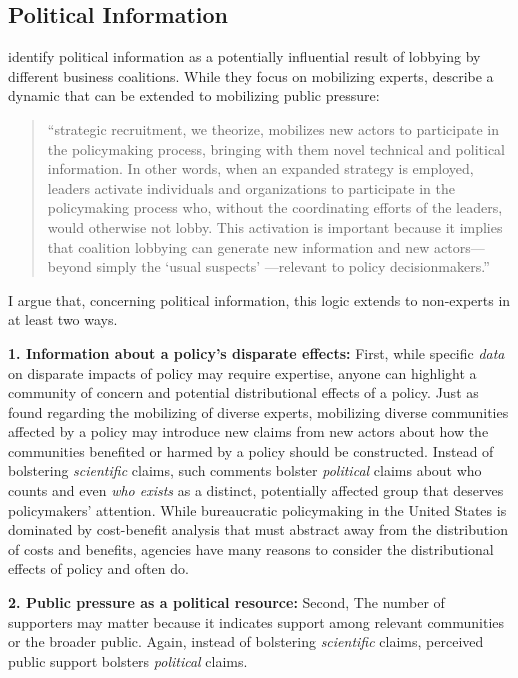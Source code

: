 \documentclass[
      12pt,
        ]{article}
\begin{document}
\hypertarget{political-information}{%
\subsection{Political Information}\label{political-information}}

\citet{Nelson2012}
identify political information as a potentially influential result of
lobbying by different business coalitions. While they focus on
mobilizing experts, \citet{Nelson2012} describe a dynamic that can be extended
to mobilizing public pressure:

\begin{quote}
``strategic recruitment, we theorize, mobilizes new actors to
participate in the policymaking process, bringing with them novel
technical and political information. In other words, when an expanded
strategy is employed, leaders activate individuals and organizations
to participate in the policymaking process who, without the
coordinating efforts of the leaders, would otherwise not lobby. This
activation is important because it implies that coalition lobbying can
generate new information and new actors---beyond simply the `usual
suspects' ---relevant to policy decisionmakers.''
\end{quote}

I argue that, concerning political information, this logic extends to
non-experts in at least two ways.

\textbf{1. Information about a policy's disparate effects:}
First, while specific \emph{data} on disparate impacts of policy may require expertise, anyone can highlight a community of concern and potential distributional effects of a policy. Just as \citet{Nelson2012} found regarding the mobilizing of diverse experts, mobilizing diverse communities affected by a policy may introduce new claims from new actors about how the communities benefited or harmed by a policy should be constructed. Instead of bolstering
\emph{scientific} claims, such comments bolster \emph{political}
claims about who counts and even \emph{who exists} as a distinct, potentially affected group that deserves policymakers' attention. While bureaucratic policymaking in the United States is dominated by cost-benefit analysis that must abstract away from the distribution of costs and benefits, agencies have many reasons to consider the distributional effects of policy and often do.

\textbf{2. Public pressure as a political resource: }
Second, The number of supporters may
matter because it indicates support among relevant communities or the broader public. Again, instead of bolstering
\emph{scientific} claims, perceived public support bolsters \emph{political}
claims.
\end{document}
